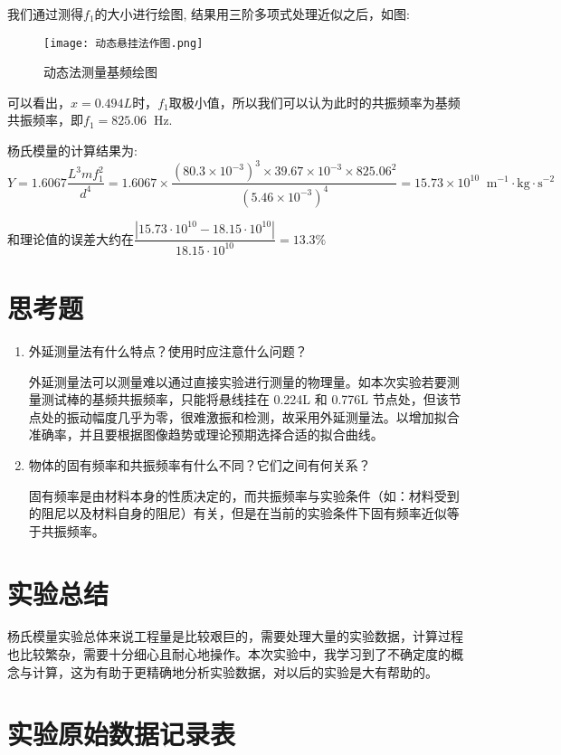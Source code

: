 \documentclass[11pt]{article}
\newcommand*{\unit}[1]{\mathop{}\!\mathrm{#1}}
\begin{document}
我们通过测得$f_1$的大小进行绘图, 结果用三阶多项式处理近似之后，如图:

\begin{figure}[H]
    \centering
    \caption{动态法测量基频绘图}
    \texttt{[image: 动态悬挂法作图.png]}
\end{figure}

可以看出，$x=0.494L$时，$f_1$取极小值，所以我们可以认为此时的共振频率为基频共振频率，即$f_1 = 825.06 \unit{Hz}$.

杨氏模量的计算结果为: 
\[
    Y = 1.6067 \frac{L^3mf_1^2}{d^4} = 1.6067\times \frac{(80.3\times 10^{-3})^3 \times 39.67\times 10^{-3} \times 825.06^2}{(5.46\times 10^{-3})^4} = 15.73\times 10^{10} \unit{m^{-1} \cdot kg \cdot s^{-2}}
\]

和理论值的误差大约在$\dfrac{|15.73 \cdot 10^{10} - 18.15\cdot 10^{10}|}{18.15\cdot 10^{10}} = 13.3\%$

\section{思考题}

\begin{enumerate}
    \item 外延测量法有什么特点？使用时应注意什么问题？
    
    外延测量法可以测量难以通过直接实验进行测量的物理量。如本次实验若要测量测试棒的基频共振频率，只能将悬线挂在 0.224L 和 0.776L 节点处，但该节点处的振动幅度几乎为零，很难激振和检测，故采用外延测量法。以增加拟合准确率，并且要根据图像趋势或理论预期选择合适的拟合曲线。
    
    \item 物体的固有频率和共振频率有什么不同？它们之间有何关系？
    
    固有频率是由材料本身的性质决定的，而共振频率与实验条件（如：材料受到的阻尼以及材料自身的阻尼）有关，但是在当前的实验条件下固有频率近似等于共振频率。

\end{enumerate}

\section{实验总结}

杨氏模量实验总体来说工程量是比较艰巨的，需要处理大量的实验数据，计算过程也比较繁杂，需要十分细心且耐心地操作。本次实验中，我学习到了不确定度的概念与计算，这为有助于更精确地分析实验数据，对以后的实验是大有帮助的。

\section{实验原始数据记录表}
\end{document}
